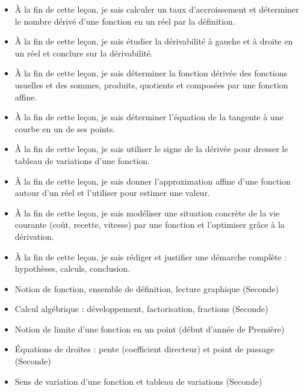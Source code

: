 \documentclass[11pt]{article}
\begin{document}
\begin{objectifs}
\begin{itemize}
\item À la fin de cette leçon, je sais calculer un taux d'accroissement et déterminer le nombre dérivé d'une fonction en un réel par la définition.
\item À la fin de cette leçon, je sais étudier la dérivabilité à gauche et à droite en un réel et conclure sur la dérivabilité.
\item À la fin de cette leçon, je sais déterminer la fonction dérivée des fonctions usuelles et des sommes, produits, quotients et composées par une fonction affine.
\item À la fin de cette leçon, je sais déterminer l'équation de la tangente à une courbe en un de ses points.
\item À la fin de cette leçon, je sais utiliser le signe de la dérivée pour dresser le tableau de variations d'une fonction.
\item À la fin de cette leçon, je sais donner l'approximation affine d'une fonction autour d'un réel et l'utiliser pour estimer une valeur.
\item À la fin de cette leçon, je sais modéliser une situation concrète de la vie courante (coût, recette, vitesse) par une fonction et l'optimiser grâce à la dérivation.
\item À la fin de cette leçon, je sais rédiger et justifier une démarche complète : hypothèses, calculs, conclusion.
\end{itemize}
\end{objectifs}

\begin{prerequis}
\begin{itemize}
\item Notion de fonction, ensemble de définition, lecture graphique (Seconde)
\item Calcul algébrique : développement, factorisation, fractions (Seconde)
\item Notion de limite d'une fonction en un point (début d'année de Première)
\item Équations de droites : pente (coefficient directeur) et point de passage (Seconde)
\item Sens de variation d'une fonction et tableau de variations (Seconde)
\end{itemize}
\end{prerequis}

\newpage
\end{document}
